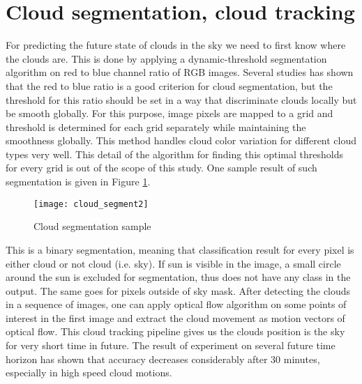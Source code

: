 
\section{Cloud segmentation, cloud tracking}
For predicting the future state of clouds in the sky we need to first know where the clouds are. This is done by applying a dynamic-threshold segmentation algorithm on red to blue channel ratio of RGB images. Several studies has shown that the red to blue ratio is a good criterion for cloud segmentation, but the threshold for this ratio should be set in a way that discriminate clouds locally but be smooth globally. For this purpose, image pixels are mapped to a grid and threshold is determined for each grid separately while maintaining the smoothness globally. This method handles cloud color variation for different cloud types very well. This detail of the algorithm for finding this optimal thresholds for every grid is out of the scope of this study. One sample result of such segmentation is given in Figure \ref{fig:cloud_seg}.
\begin{figure}[h]
\caption{Cloud segmentation sample}
\label{fig:cloud_seg}
\texttt{[image: cloud\_segment2]}
\centering
\end{figure}

This is a binary segmentation, meaning that classification result for every pixel is either cloud or not cloud (i.e. sky). If sun is visible in the image, a small circle around the sun is excluded for segmentation, thus does not have any class in the output. The same goes for pixels outside of sky mask. After detecting the clouds in a sequence of images, one can apply optical flow algorithm on some points of interest in the first image and extract the cloud movement as motion vectors of optical flow. This cloud tracking pipeline gives us the clouds position is the sky for very short time in future. The result of experiment on several future time horizon has shown that accuracy decreases considerably after 30 minutes, especially in high speed cloud motions.

